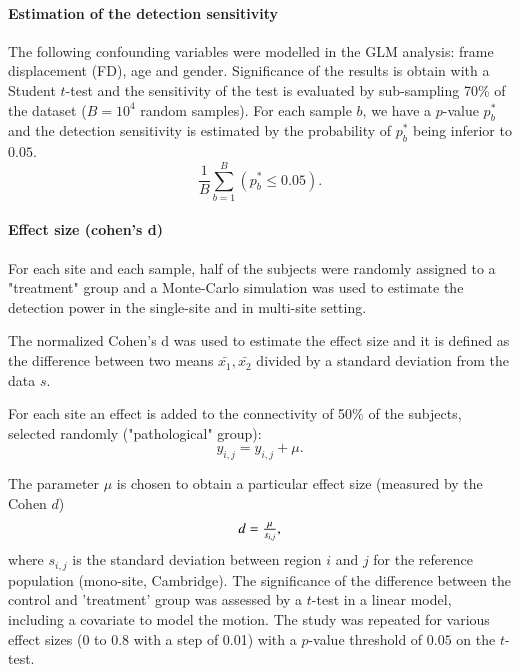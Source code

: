\documentclass[authoryear]{elsarticle}
\begin{document}
\paragraph{Estimation of the detection sensitivity}
The following confounding variables were modelled in the GLM analysis: frame displacement (FD), age and gender. Significance of the results is obtain with a Student $t$-test and the sensitivity of the test is evaluated by sub-sampling 70\% of the dataset ($B=10^4$ random samples). For each sample $b$, we have a $p$-value $p^{*}_b$ and the detection sensitivity is estimated by the probability of $p^{*}_b$ being inferior to $0.05$.
\begin{equation}\label{Detection power}  
    \frac{1}{B}\sum\limits_{b=1}^B\left(p^{*}_b\leq0.05\right).
\end{equation}


\paragraph{Effect size (cohen's d)}
For each site and each sample, half of the subjects were randomly assigned to a "treatment" group and a Monte-Carlo simulation was used to estimate the detection power in the single-site and in multi-site setting.

The normalized Cohen's d was used to estimate the effect size and it is defined as the difference between two means $\bar{x_{1}},\bar{x_{2}}$ divided by a standard deviation from the data $s$.

For each site an effect is added to the connectivity of 50\% of the subjects, selected randomly ("pathological" group):
\begin{equation}
	y_{i,j} = y_{i,j} + \mu.
\end{equation}

The parameter $\mu$ is chosen to obtain a particular effect size (measured by the Cohen $d$)
\begin{equation}\label{cohen's d}
    \begin{array}{l l}
      d = \frac{\mu}{s_{i,j}},      
    \end{array}
\end{equation}
where $s_{i,j}$ is the standard deviation between region $i$ and $j$ for the reference population (mono-site, Cambridge). The significance of the difference between the control and 'treatment' group was assessed by a $t$-test in a linear model, including a covariate to model the motion. The study was repeated for various effect sizes (0 to 0.8 with a step of 0.01) with a $p$-value threshold of $0.05$ on the $t$-test.
\end{document}
